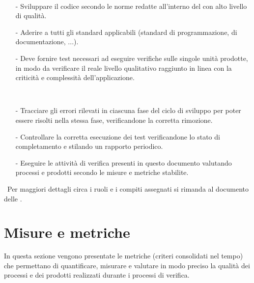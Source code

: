 \documentclass[a4paper, titlepage]{article}
\begin{document}
\begin{description}
\begin{itemize}
\end{itemize}
\ 
\item {}
\begin{itemize}
\item[-] Sviluppare il codice secondo le norme redatte all'interno del  con alto livello di qualità.
\item[-] Aderire a tutti gli standard applicabili (standard di programmazione, di documentazione, ...).
\item[-] Deve fornire test necessari ad eseguire verifiche sulle singole unità prodotte, in modo da verificare il reale livello
qualitativo raggiunto in linea con la criticità e complessità dell’applicazione.
\end{itemize}
\ 
\item {}
\begin{itemize}
\item[-] Tracciare gli errori rilevati in ciascuna fase del ciclo di sviluppo per poter essere risolti nella stessa fase, verificandone la corretta rimozione.
\item[-] Controllare la corretta esecuzione dei test verificandone lo stato di completamento e stilando un rapporto periodico. 
\item[-] Eseguire le attività di verifica presenti in questo documento valutando processi e prodotti secondo le misure e metriche stabilite.
\end{itemize}

\end{description}
\ 
\newline Per maggiori dettagli circa i ruoli e i compiti assegnati si rimanda al documento delle .

\newpage
\appendix
\section{Misure e metriche}
\label{sec:metr}
In questa sezione vengono presentate le metriche (criteri consolidati nel tempo) che permettano di quantificare, misurare e valutare in modo preciso la qualità dei processi e dei prodotti realizzati durante i processi di verifica.
\end{document}

